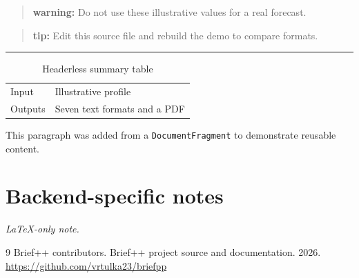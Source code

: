 \documentclass[11pt,a4paper]{article}
\begin{document}
\begin{quote}\textbf{warning:} Do not use these illustrative values for a real forecast.\end{quote}
\begin{quote}\textbf{tip:} Edit this source file and rebuild the demo to compare formats.\end{quote}
\par\noindent\rule{\linewidth}{0.4pt}\par
\begin{longtable}{ll}
\caption{Headerless summary table}\\
Input & Illustrative profile \\
Outputs & Seven text formats and a PDF \\
\end{longtable}
This paragraph was added from a \texttt{DocumentFragment} to demonstrate reusable content.

\newpage
\section{Backend-specific notes}
\noindent\textit{LaTeX-only note.}
\begin{thebibliography}{9}
 Brief++ contributors. Brief++ project source and documentation. 2026. \url{https://github.com/vrtulka23/briefpp}
\end{thebibliography}
\end{document}
